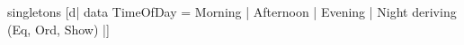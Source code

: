 \begin{code}
singletons [d|
  data TimeOfDay
    = Morning
    | Afternoon
    | Evening
    | Night
    deriving (Eq, Ord, Show)
  |]
\end{code}
